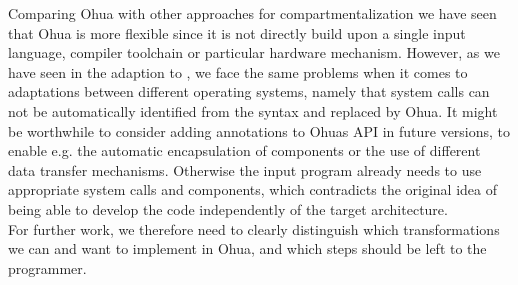 Comparing Ohua with other approaches for compartmentalization we have seen that Ohua is more flexible since it is not directly build upon a single input language, compiler toolchain or particular hardware mechanism. However, as we have seen in the adaption to \md, we face the same problems when it comes to adaptations between different operating systems, namely that system calls can not be automatically identified from the syntax and replaced by Ohua. It might be worthwhile to consider adding annotations to Ohuas API in future versions, to enable e.g. the automatic encapsulation of components or the use of different data transfer mechanisms. Otherwise the input program already needs to use appropriate system calls and components, which contradicts the original idea of being able to develop the code independently of the target architecture. \\

For further work, we therefore need to clearly distinguish which transformations we can and want to implement in Ohua, and which steps should be left to the programmer.  

